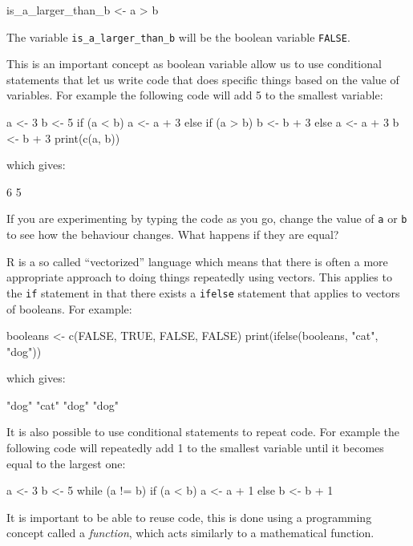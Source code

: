 \begin{Rin}
is_a_larger_than_b <- a > b
\end{Rin}

The variable \texttt{is_a_larger_than_b} will be the boolean variable
\texttt{FALSE}.

This is an important concept as boolean variable allow us to use conditional
statements that let us write code that does specific things based on the value
of variables. For example the following code will add 5 to the smallest
variable:

\begin{Rin}
a <- 3
b <- 5
if (a < b) {
  a <- a + 3
} else if (a > b) {
  b <- b + 3
} else {
  a <- a + 3
  b <- b + 3
}
print(c(a, b))
\end{Rin}

which gives:

\begin{Rout}
[1] 6 5
\end{Rout}

If you are experimenting by typing the code as you go, change the value of
\texttt{a} or \texttt{b} to see how the behaviour changes.
What happens if they are equal?

R is a so called ``vectorized'' language which means that there is often a more
appropriate approach to doing things repeatedly using vectors. This applies to
the \texttt{if} statement in that there exists a \texttt{ifelse}
statement that applies to vectors of booleans. For example:

\begin{Rin}
booleans <- c(FALSE, TRUE, FALSE, FALSE)
print(ifelse(booleans, "cat", "dog"))
\end{Rin}

which gives:

\begin{Rout}
[1] "dog" "cat" "dog" "dog"
\end{Rout}

It is also possible to use conditional statements to repeat code. For
example the following code will repeatedly add 1 to the smallest variable until
it becomes equal to the largest one:

\begin{Rin}
a <- 3
b <- 5
while (a != b) {
  if (a < b) {
    a <- a + 1
  }
  else {
    b <- b + 1
  }
}
\end{Rin}

It is important to be able to reuse code, this is done using a programming
concept called a \textit{function}, which acts similarly to a mathematical
function.

